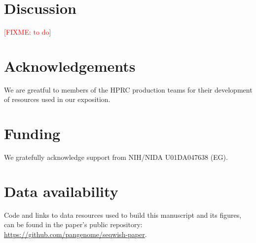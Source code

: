 \documentclass{bioinfo}
\theoremstyle{definition}
\newcommand{\red}[1]{{\textcolor{Red}{#1}}}
\newcommand{\FIXME}[1]{\red{[FIXME: #1]}}
\begin{document}

\section{Discussion}
\label{sec:discussion}
\FIXME{to do}

\section*{Acknowledgements}

We are greatful to members of the HPRC production teams for their development of resources used in our exposition.

\section*{Funding}

We gratefully acknowledge support from NIH/NIDA U01DA047638 (EG).

\section*{Data availability}

Code and links to data resources used to build this manuscript and its figures, can be found in the paper's public repository: \url{https://github.com/pangenome/seqwish-paper}.




\end{document}
